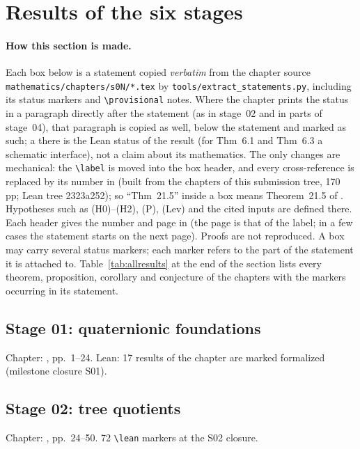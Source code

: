 \section{Results of the six stages}\label{sec:results}

\paragraph{How this section is made.} Each box below is a statement copied \emph{verbatim} from the chapter source
\texttt{mathematics/chapters/s0N/*.tex} by \texttt{tools/extract\_statements.py}, including its status markers and
\verb|\provisional| notes. Where the chapter prints the status in a paragraph directly after the statement (as in stage~02
and in parts of stage~04), that paragraph is copied as well, below the statement and marked as such; a \stformal{} there
is the Lean status of the result (for Thm~6.1 and Thm~6.3 a schematic interface), not a claim about its mathematics. The only changes are mechanical: the \verb|\label| is moved into the box header, and every
cross-reference is replaced by its number in \mainpdf{} (built from the chapters of this submission tree, 170 pp; Lean tree 2323a252); so ``Thm~21.5'' inside a box
means Theorem~21.5 of \mainpdf. Hypotheses such as (H0)--(H2), (P), (Lev) and the cited inputs are defined there.
Each header gives the number and page in \mainpdf{} (the page is that of the label; in a few cases the statement
starts on the next page). Proofs are not reproduced. A box may carry several status markers;
each marker refers to the part of the statement it is attached to. Table~\ref{tab:allresults} at the end of the section
lists every theorem, proposition, corollary and conjecture of the chapters with the markers occurring in its statement.

\subsection{Stage 01: quaternionic foundations}
Chapter: \mainpdf, pp.~1--24. Lean: 17 results of the chapter are marked formalized (milestone closure S01).


\subsection{Stage 02: tree quotients}
Chapter: \mainpdf, pp.~24--50. 72 \verb|\lean| markers at the S02 closure.


